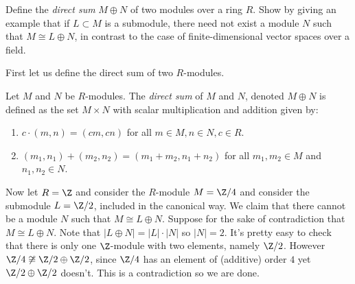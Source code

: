 \begin{problem}
Define the \emph{direct sum} $M\oplus N$ of two modules over a ring $R$. Show by giving an example that if $L \subset M$ is a submodule, there need not exist a module $N$ such that $M \cong L \oplus N$, in contrast to the case of finite-dimensional vector spaces over a field.
\end{problem}
First let us define the direct sum of two $R$-modules.
\begin{definition}
  Let $M$ and $N$ be $R$-modules. The {\em direct sum} of $M$ and $N$, denoted $M\oplus 
  N$ is defined as the set $M\times N$ with scalar multiplication and addition given by:
  \begin{enumerate}
    \item $c\cdot (m,n)= (cm, cn)$ for all $m\in M, n\in N, c\in R$.
    \item $(m_1, n_1) + (m_2, n_2) = (m_1 + m_2, n_1 + n_2)$ for all $m_1,m_2\in M$ and $n_1,n_2\in N$.     
  \end{enumerate}    
\end{definition} 
Now let $R=\Z$ and consider the $R$-module $M=\Z/4$ and consider the submodule $L=\Z/2$, included in the canonical way. We claim that there cannot be a module $N$ such that $M\cong L\oplus N$. Suppose for the sake of contradiction that $M\cong L\oplus N$. Note that $|L\oplus N| = |L|\cdot |N|$ so $|N|=2$. It's pretty easy to check that there is only one $\Z$-module with two elements, namely $\Z/2$. However $\Z/4\not\cong \Z/2\oplus \Z/2$, since $\Z/4$ has an element of (additive) order $4$ yet $\Z/2\oplus\Z/2$ doesn't. This is a contradiction so we are done.    